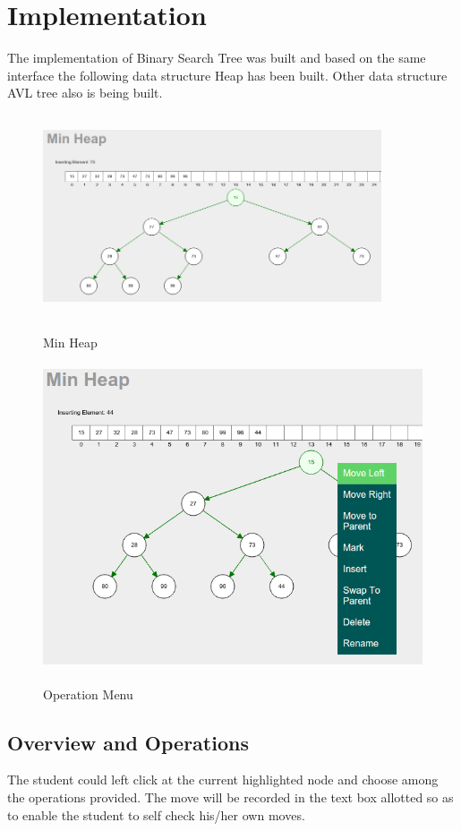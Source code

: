 \documentclass[aps,letterpaper,12pt]{revtex4}
\begin{document}
\newpage
\section{Implementation}
	The implementation of Binary Search Tree was built and based on the same interface the following data structure Heap has been built. Other data structure AVL tree also is being built.

\begin{figure}[H]
\centering
{\label{fig:MinHeap}\includegraphics[height=6cm,width=10cm]{minheap.png}}   
\caption{Min Heap}
{\label{fig:OperationMenu}\includegraphics[height=9cm,width=12cm\textwidth]{menu.png}}
\caption{Operation Menu}
\label{fig:minheap}    
\end{figure}

\subsection{Overview and Operations}
	The student could left click at the current highlighted node and choose among the operations provided. The move will be recorded in the text box allotted so as to enable the student to self check his/her own moves.
\end{document}
